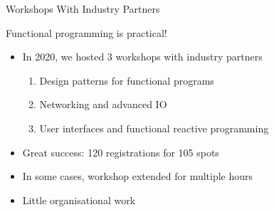 \documentclass{beamer}
\begin{document}
\begin{frame}{Workshops With Industry Partners}
\vspace{\baselineskip}

\centerline{\Large{\alert{Functional programming is practical!}}}
\pause
\begin{itemize}
\item In 2020, we hosted 3 workshops with industry partners
\begin{enumerate}[<3->]
  \item Design patterns for functional programs
  \item Networking and advanced IO
  \item User interfaces and functional reactive programming
\end{enumerate}
\item<4-> Great success: 120 registrations for 105 spots
\item<5-> In some cases, workshop extended for multiple hours
\item<6-> Little organisational work
\end{itemize}
\end{frame}

\end{document}

